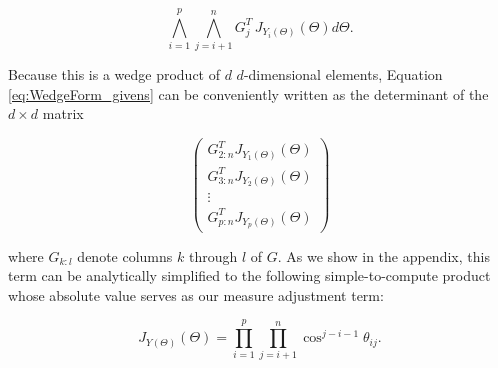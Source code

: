 \documentclass[ba]{imsart}
\numberwithin{equation}{section}
\theoremstyle{plain}
\begin{document}
\begin{equation}
\label{eq:WedgeForm_givens}
\bigwedge_{i=1}^p \bigwedge_{j=i+1}^n G_j^T\, J_{Y_i(\Theta)}(\Theta) d\Theta.
\end{equation}

\noindent Because this is a wedge product of $d$ $d$-dimensional elements, Equation \ref{eq:WedgeForm_givens} can be conveniently written as the determinant of the $d \times d$ matrix

\begin{equation}
\label{eq:measure_matrix_form}
\begin{pmatrix}
G_{2:n}^T J_{Y_1(\Theta)}(\Theta)\\
G_{3:n}^T J_{Y_2(\Theta)}(\Theta)\\
\vdots\\
G_{p:n}^T J_{Y_p(\Theta)}(\Theta)
\end{pmatrix}
\end{equation}

\noindent where $G_{k:l}$ denote columns $k$ through $l$ of $G$. As we show in the appendix, this term can be analytically simplified to the following simple-to-compute product whose absolute value serves as our measure adjustment term:

\begin{equation}
\label{eq:final_change_of_measure}
J_{Y(\Theta)}(\Theta) = \prod_{i=1}^p \prod_{j=i+1}^n \cos^{j-i-1} \theta_{ij}.
\end{equation}


\end{document}
